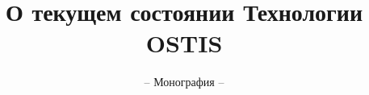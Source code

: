 \documentclass[graybox,envcountchap,sectrefs]{svmono}
\begin{document}

\author{}
\title{О текущем состоянии Технологии OSTIS}
\subtitle{-- Монография --}
\maketitle

\frontmatter%

%

%

\tableofcontents




\mainmatter%






\printindex

\end{document}
